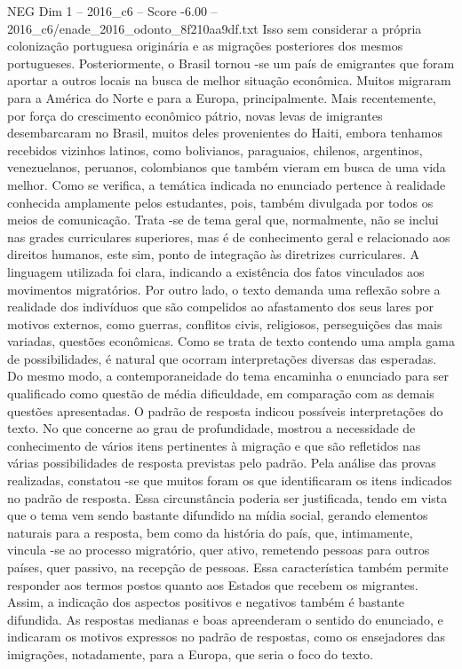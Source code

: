 \begin{textsample}{NEG Dim 1 – 2016\_c6 – Score -6.00 – 2016\_c6/enade\_2016\_odonto\_8f210aa9df.txt}
Isso sem considerar a própria colonização portuguesa originária e as migrações posteriores dos mesmos portugueses.
Posteriormente, o Brasil tornou -se um país de emigrantes que foram aportar a outros locais na busca de melhor situação econômica.
Muitos migraram para a América do Norte e para a Europa, principalmente.
Mais recentemente, por força do crescimento econômico pátrio, novas levas de imigrantes desembarcaram no Brasil, muitos deles provenientes do Haiti, embora tenhamos recebidos vizinhos latinos, como bolivianos, paraguaios, chilenos, argentinos, venezuelanos, peruanos, colombianos que também vieram em busca de uma vida melhor.
Como se verifica, a temática indicada no enunciado pertence à realidade conhecida amplamente pelos estudantes, pois, também divulgada por todos os meios de comunicação.
Trata -se de tema geral que, normalmente, não se inclui nas grades curriculares superiores, mas é de conhecimento geral e relacionado aos direitos humanos, este sim, ponto de integração às diretrizes curriculares.
A linguagem utilizada foi clara, indicando a existência dos fatos vinculados aos movimentos migratórios.
Por outro lado, o texto demanda uma reflexão sobre a realidade dos indivíduos que são compelidos ao afastamento dos seus lares por motivos externos, como guerras, conflitos civis, religiosos, perseguições das mais variadas, questões econômicas.
Como se trata de texto contendo uma ampla gama de possibilidades, é natural que ocorram interpretações diversas das esperadas.
Do mesmo modo, a contemporaneidade do tema encaminha o enunciado para ser qualificado como questão de média dificuldade, em comparação com as demais questões apresentadas.
O padrão de resposta indicou possíveis interpretações do texto.
No que concerne ao grau de profundidade, mostrou a necessidade de conhecimento de vários itens pertinentes à migração e que são refletidos nas várias possibilidades de resposta previstas pelo padrão.
Pela análise das provas realizadas, constatou -se que muitos foram os que identificaram os itens indicados no padrão de resposta.
Essa circunstância poderia ser justificada, tendo em vista que o tema vem sendo bastante difundido na mídia social, gerando elementos naturais para a resposta, bem como da história do país, que, intimamente, vincula -se ao processo migratório, quer ativo, remetendo pessoas para outros países, quer passivo, na recepção de pessoas.
Essa característica também permite responder aos termos postos quanto aos Estados que recebem os migrantes.
Assim, a indicação dos aspectos positivos e negativos também é bastante difundida.
As respostas medianas e boas apreenderam o sentido do enunciado, e indicaram os motivos expressos no padrão de respostas, como os ensejadores das imigrações, notadamente, para a Europa, que seria o foco do texto.

\end{textsample}
